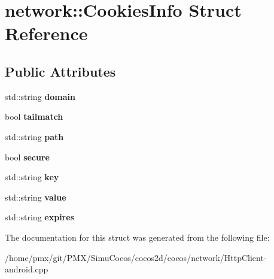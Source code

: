 \hypertarget{structnetwork_1_1CookiesInfo}{}\section{network\+:\+:Cookies\+Info Struct Reference}
\label{structnetwork_1_1CookiesInfo}
\subsection*{Public Attributes}
\begin{DoxyCompactItemize}
\item 
\mbox{\label{structnetwork_1_1CookiesInfo_a98daa482524c0cecee2ceac7f7acbc25}} 
std\+::string {\bfseries domain}
\item 
\mbox{\label{structnetwork_1_1CookiesInfo_a9f1fa02d08dec25790d5c63410fd84f2}} 
bool {\bfseries tailmatch}
\item 
\mbox{\label{structnetwork_1_1CookiesInfo_a5e7462504019439d35d859e4ee9c50d7}} 
std\+::string {\bfseries path}
\item 
\mbox{\label{structnetwork_1_1CookiesInfo_a2e70d524af6c52a7b3d5d01eb00d23b7}} 
bool {\bfseries secure}
\item 
\mbox{\label{structnetwork_1_1CookiesInfo_aab5d8ffabd78820a0acdb759ec8c07ff}} 
std\+::string {\bfseries key}
\item 
\mbox{\label{structnetwork_1_1CookiesInfo_a021312a016b6199d1c49c7274f83dec6}} 
std\+::string {\bfseries value}
\item 
\mbox{\label{structnetwork_1_1CookiesInfo_aff90353456298122d479a14182f01910}} 
std\+::string {\bfseries expires}
\end{DoxyCompactItemize}


The documentation for this struct was generated from the following file\+:\begin{DoxyCompactItemize}
\item 
/home/pmx/git/\+P\+M\+X/\+Simu\+Cocos/cocos2d/cocos/network/Http\+Client-\/android.\+cpp\end{DoxyCompactItemize}
